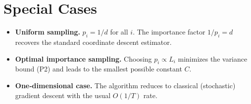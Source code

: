 \documentclass{article}
\begin{document}
\section*{Special Cases}
\begin{itemize}
\item \textbf{Uniform sampling.} $p_i=1/d$ for all $i$. The importance factor $1/p_i=d$ recovers the standard coordinate descent estimator.
\item \textbf{Optimal importance sampling.} Choosing $p_i\propto L_i$ minimizes the variance bound (P2) and leads to the smallest possible constant $C$.
\item \textbf{One‑dimensional case.} The algorithm reduces to classical (stochastic) gradient descent with the usual $O(1/T)$ rate.
\end{itemize}
\end{document}
